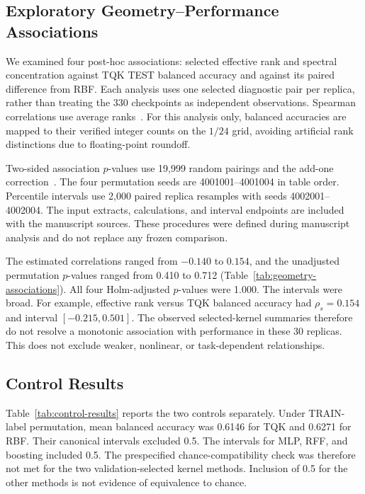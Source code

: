 \subsection{Exploratory Geometry--Performance Associations}
\label{sec:results-correlations}

We examined four post-hoc associations: selected effective rank and spectral concentration against TQK TEST balanced accuracy and against its paired difference from RBF. Each analysis uses one selected diagnostic pair per replica, rather than treating the 330 checkpoints as independent observations. Spearman correlations use average ranks~\cite{spearman1904association}. For this analysis only, balanced accuracies are mapped to their verified integer counts on the $1/24$ grid, avoiding artificial rank distinctions due to floating-point roundoff.



Two-sided association $p$-values use 19,999 random pairings and the add-one correction~\cite{phipson2010permutation}. The four permutation seeds are 4001001--4001004 in table order. Percentile intervals use 2,000 paired replica resamples with seeds 4002001--4002004. The input extracts, calculations, and interval endpoints are included with the manuscript sources. These procedures were defined during manuscript analysis and do not replace any frozen comparison.

The estimated correlations ranged from $-0.140$ to $0.154$, and the unadjusted permutation $p$-values ranged from 0.410 to 0.712 (Table~\ref{tab:geometry-associations}). All four Holm-adjusted $p$-values were 1.000. The intervals were broad. For example, effective rank versus TQK balanced accuracy had $\rho_s=0.154$ and interval $[-0.215,0.501]$. The observed selected-kernel summaries therefore do not resolve a monotonic association with performance in these 30 replicas. This does not exclude weaker, nonlinear, or task-dependent relationships.

\subsection{Control Results}
\label{sec:results-controls}

Table~\ref{tab:control-results} reports the two controls separately. Under TRAIN-label permutation, mean balanced accuracy was 0.6146 for TQK and 0.6271 for RBF. Their canonical intervals excluded 0.5. The intervals for MLP, RFF, and boosting included 0.5. The prespecified chance-compatibility check was therefore not met for the two validation-selected kernel methods. Inclusion of 0.5 for the other methods is not evidence of equivalence to chance.

